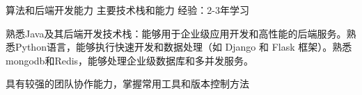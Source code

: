 

\begin{cventries}

  \cventry
    {算法和后端开发能力} %
    {主要技术栈和能力} %
    {} %
    {经验：2-3年学习} %
    {
      \begin{cvitems} %
        \item {熟悉Java及其后端开发技术栈：能够用于企业级应用开发和高性能的后端服务。熟悉Python语言，能够执行快速开发和数据处理（如 Django 和 Flask 框架）。熟悉mongodb和Redis，能够处理企业级数据库和多并发服务。}
        \item {具有较强的团队协作能力，掌握常用工具和版本控制方法}
      \end{cvitems}
    }



\end{cventries}
